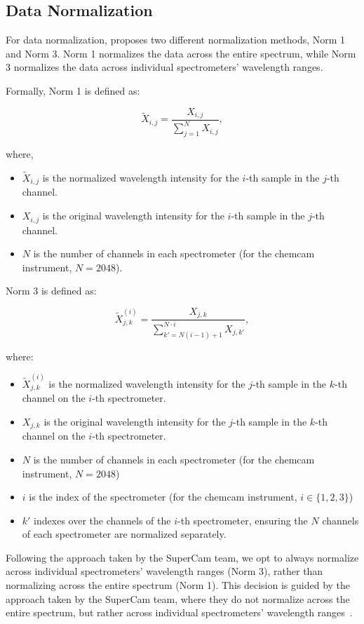 \subsection{Data Normalization}
For data normalization, \citet{cleggRecalibrationMarsScience2017} proposes two different normalization methods, Norm 1 and Norm 3.
Norm 1 normalizes the data across the entire spectrum, while Norm 3 normalizes the data across individual spectrometers' wavelength ranges.

Formally, Norm 1 is defined as:

\begin{equation}
	\tilde{X}_{i,j} = \frac{X_{i,j}}{\sum_{j=1}^{N} X_{i,j}},
\end{equation}

where,

\begin{itemize}
	\item $\tilde{X}_{i,j}$ is the normalized wavelength intensity for the $i$-th sample in the $j$-th channel.
	\item $X_{i,j}$ is the original wavelength intensity for the $i$-th sample in the $j$-th channel.
	\item $N$ is the number of channels in each spectrometer (for the \gls{chemcam} instrument, $N = 2048$).
\end{itemize}

Norm 3 is defined as:

\begin{equation}
	\tilde{X}_{j,k}^{(i)} = \frac{X_{j,k}}{\sum_{k'=N(i-1)+1}^{N \cdot i} X_{j,k'}},
\end{equation}

where:

\begin{itemize}
	\item $\tilde{X}_{j,k}^{(i)}$ is the normalized wavelength intensity for the $j$-th sample in the $k$-th channel on the $i$-th spectrometer.
	\item $X_{j,k}$ is the original wavelength intensity for the $j$-th sample in the $k$-th channel on the $i$-th spectrometer.
	\item $N$ is the number of channels in each spectrometer (for the \gls{chemcam} instrument, $N = 2048$)
	\item $i$ is the index of the spectrometer (for the \gls{chemcam} instrument, $i \in \{1, 2, 3\}$)
	\item $k'$ indexes over the channels of the $i$-th spectrometer, ensuring the $N$ channels of each spectrometer are normalized separately.
\end{itemize}

Following the approach taken by the SuperCam team, we opt to always normalize across individual spectrometers' wavelength ranges (Norm 3), rather than normalizing across the entire spectrum (Norm 1).
This decision is guided by the approach taken by the SuperCam team, where they do not normalize across the entire spectrum, but rather across individual spectrometers' wavelength ranges~\cite{andersonPostlandingMajorElement2022}.